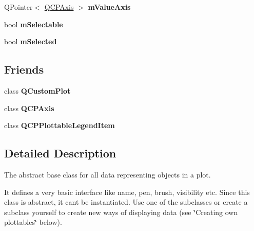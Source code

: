 \begin{DoxyCompactItemize}
\item 
Q\+Pointer$<$ \hyperlink{class_q_c_p_axis}{Q\+C\+P\+Axis} $>$ {\bfseries m\+Value\+Axis}\hypertarget{class_q_c_p_abstract_plottable_a2901452ca4aea911a1827717934a4bda}{}\label{class_q_c_p_abstract_plottable_a2901452ca4aea911a1827717934a4bda}

\item 
bool {\bfseries m\+Selectable}\hypertarget{class_q_c_p_abstract_plottable_aceee52342c8e75727abcbd164986fdcb}{}\label{class_q_c_p_abstract_plottable_aceee52342c8e75727abcbd164986fdcb}

\item 
bool {\bfseries m\+Selected}\hypertarget{class_q_c_p_abstract_plottable_a43f68a0603e9bcd016bdfa6d9d5c41c9}{}\label{class_q_c_p_abstract_plottable_a43f68a0603e9bcd016bdfa6d9d5c41c9}

\end{DoxyCompactItemize}
\subsection*{Friends}
\begin{DoxyCompactItemize}
\item 
class {\bfseries Q\+Custom\+Plot}\hypertarget{class_q_c_p_abstract_plottable_a1cdf9df76adcfae45261690aa0ca2198}{}\label{class_q_c_p_abstract_plottable_a1cdf9df76adcfae45261690aa0ca2198}

\item 
class {\bfseries Q\+C\+P\+Axis}\hypertarget{class_q_c_p_abstract_plottable_af123edeca169ec7a31958a1d714e1a8a}{}\label{class_q_c_p_abstract_plottable_af123edeca169ec7a31958a1d714e1a8a}

\item 
class {\bfseries Q\+C\+P\+Plottable\+Legend\+Item}\hypertarget{class_q_c_p_abstract_plottable_a104c78e91302afd6842a903e472f552f}{}\label{class_q_c_p_abstract_plottable_a104c78e91302afd6842a903e472f552f}

\end{DoxyCompactItemize}


\subsection{Detailed Description}
The abstract base class for all data representing objects in a plot. 

It defines a very basic interface like name, pen, brush, visibility etc. Since this class is abstract, it can\textquotesingle{}t be instantiated. Use one of the subclasses or create a subclass yourself to create new ways of displaying data (see \char`\"{}\+Creating own plottables\char`\"{} below).

